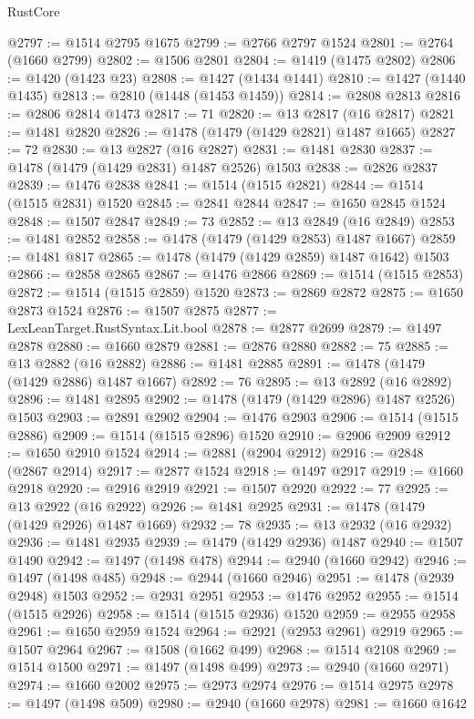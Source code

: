 \begin{lexlean}{RustCore}
\begin{coremodule}
@2797 := @1514 @2795 @1675
@2799 := @2766 @2797 @1524
@2801 := @2764 (@1660 @2799)
@2802 := @1506 @2801
@2804 := @1419 (@1475 @2802)
@2806 := @1420 (@1423 @23)
@2808 := @1427 (@1434 @1441)
@2810 := @1427 (@1440 @1435)
@2813 := @2810 (@1448 (@1453 @1459))
@2814 := @2808 @2813
@2816 := @2806 @2814 @1473
@2817 := 71
@2820 := @13 @2817 (@16 @2817)
@2821 := @1481 @2820
@2826 := @1478 (@1479 (@1429 @2821) @1487 @1665)
@2827 := 72
@2830 := @13 @2827 (@16 @2827)
@2831 := @1481 @2830
@2837 := @1478 (@1479 (@1429 @2831) @1487 @2526) @1503
@2838 := @2826 @2837
@2839 := @1476 @2838
@2841 := @1514 (@1515 @2821)
@2844 := @1514 (@1515 @2831) @1520
@2845 := @2841 @2844
@2847 := @1650 @2845 @1524
@2848 := @1507 @2847
@2849 := 73
@2852 := @13 @2849 (@16 @2849)
@2853 := @1481 @2852
@2858 := @1478 (@1479 (@1429 @2853) @1487 @1667)
@2859 := @1481 @817
@2865 := @1478 (@1479 (@1429 @2859) @1487 @1642) @1503
@2866 := @2858 @2865
@2867 := @1476 @2866
@2869 := @1514 (@1515 @2853)
@2872 := @1514 (@1515 @2859) @1520
@2873 := @2869 @2872
@2875 := @1650 @2873 @1524
@2876 := @1507 @2875
@2877 := LexLeanTarget.RustSyntax.Lit.bool
@2878 := @2877 @2699
@2879 := @1497 @2878
@2880 := @1660 @2879
@2881 := @2876 @2880
@2882 := 75
@2885 := @13 @2882 (@16 @2882)
@2886 := @1481 @2885
@2891 := @1478 (@1479 (@1429 @2886) @1487 @1667)
@2892 := 76
@2895 := @13 @2892 (@16 @2892)
@2896 := @1481 @2895
@2902 := @1478 (@1479 (@1429 @2896) @1487 @2526) @1503
@2903 := @2891 @2902
@2904 := @1476 @2903
@2906 := @1514 (@1515 @2886)
@2909 := @1514 (@1515 @2896) @1520
@2910 := @2906 @2909
@2912 := @1650 @2910 @1524
@2914 := @2881 (@2904 @2912)
@2916 := @2848 (@2867 @2914)
@2917 := @2877 @1524
@2918 := @1497 @2917
@2919 := @1660 @2918
@2920 := @2916 @2919
@2921 := @1507 @2920
@2922 := 77
@2925 := @13 @2922 (@16 @2922)
@2926 := @1481 @2925
@2931 := @1478 (@1479 (@1429 @2926) @1487 @1669)
@2932 := 78
@2935 := @13 @2932 (@16 @2932)
@2936 := @1481 @2935
@2939 := @1479 (@1429 @2936) @1487
@2940 := @1507 @1490
@2942 := @1497 (@1498 @478)
@2944 := @2940 (@1660 @2942)
@2946 := @1497 (@1498 @485)
@2948 := @2944 (@1660 @2946)
@2951 := @1478 (@2939 @2948) @1503
@2952 := @2931 @2951
@2953 := @1476 @2952
@2955 := @1514 (@1515 @2926)
@2958 := @1514 (@1515 @2936) @1520
@2959 := @2955 @2958
@2961 := @1650 @2959 @1524
@2964 := @2921 (@2953 @2961) @2919
@2965 := @1507 @2964
@2967 := @1508 (@1662 @499)
@2968 := @1514 @2108
@2969 := @1514 @1500
@2971 := @1497 (@1498 @499)
@2973 := @2940 (@1660 @2971)
@2974 := @1660 @2002
@2975 := @2973 @2974
@2976 := @1514 @2975
@2978 := @1497 (@1498 @509)
@2980 := @2940 (@1660 @2978)
@2981 := @1660 @1642

\end{coremodule}
\end{lexlean}
